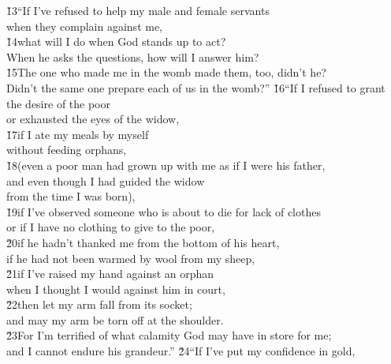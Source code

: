 \begin{poetry}
\poeml \v{13}``If I've refused to help my male and female servants \\
\poemll    when they complain against me, \\
\poeml \v{14}what will I do when God stands up to act? \\
\poemll    When he asks the questions, how will I answer him? \\
\poeml \v{15}The one who made me in the womb made them, too, didn't he? \\
\poemll    Didn't the same one prepare each of us in the womb?''
\poeml \v{16}``If I refused to grant the desire of the poor \\
\poemll    or exhausted the eyes of the widow, \\
\poeml \v{17}if I ate my meals by myself \\
\poemll    without feeding orphans, \\
\poeml \v{18}(even a poor man had grown up with me as if I were his father, \\
\poemll    and even though I had guided the widow \\
\poemlll       from the time I was born), \\
\poeml \v{19}if I've observed someone who is about to die for lack of clothes \\
\poemll    or if I have no clothing to give to the poor, \\
\poeml \v{20}if he hadn't thanked me from the bottom of his heart, \\
\poemll    if he had not been warmed by wool from my sheep, \\
\poeml \v{21}if I've raised my hand against an orphan \\
\poemll    when I thought I would against him in court, \\
\poeml \v{22}then let my arm fall from its socket; \\
\poemll    and may my arm be torn off at the shoulder. \\
\poeml \v{23}For I'm terrified of what calamity God may have in store for me; \\
\poemll    and I cannot endure his grandeur.''
\poeml \v{24}``If I've put my confidence in gold, \\

\end{poetry}
